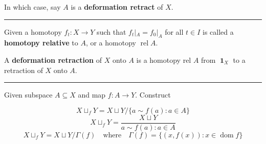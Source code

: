 \documentclass[12pt]{article}
\newcommand{\keyword}[1]{\textbf{#1}}
\newcommand{\sepline}{\rule{\textwidth}{0.4pt}}
\theoremstyle{definition}
\newcommand{\isp}[1]{\quad\text{#1}\quad}
\newcommand{\<}{\langle}
\renewcommand{\>}{\rangle}
\DeclareMathOperator{\id}{\mathbf{1}}
\DeclareMathOperator{\rel}{rel}
\begin{document}
In which case, say $A$ is a \keyword{deformation retract} of $X$.

\sepline

Given a homotopy $f_t : X \to Y$ such that $f_t|_A = f_0|_A$ for all $t \in I$ is called a \keyword{homotopy relative} to $A$, or a homotopy $\rel A$.

A \keyword{deformation retraction} of $X$ onto $A$ is a homotopy rel $A$ from $\id_X$ to a retraction of $X$ onto $A$.


\sepline

Given subspace $A \subseteq X$ and map $f : A \to Y$.
Construct


\[
    X \sqcup_f Y = X \sqcup Y / \{a \sim f(a) : a \in A\}
\]
\[
    X \sqcup_f Y = \frac{X \sqcup Y}{a \sim f(a) : a \in A}
\]
\[
    X \sqcup_f Y = X \sqcup Y / \Gamma(f)
    \isp{where}
    \Gamma(f) = \{(x, f(x)) : x \in \operatorname{dom} f\}
\]
\end{document}
